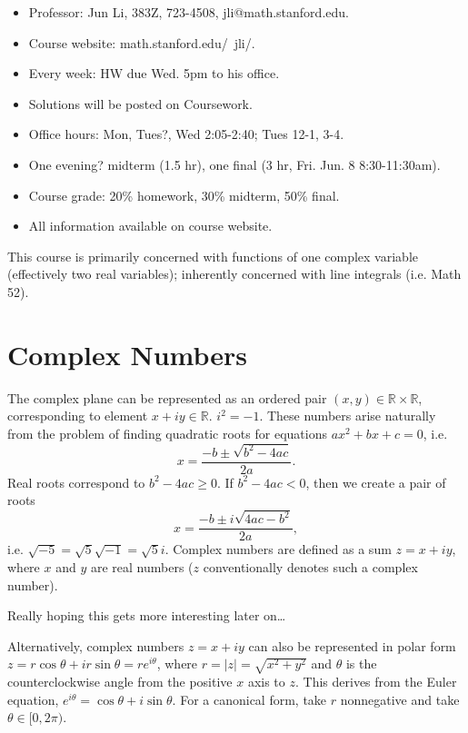 \documentclass{artikel3}
\date{\formatdate{2012}{04}{02}}
\newcommand{\abs}[1]{\left|#1\right|}
\newcommand{\reals}{\mathbb{R}}
\newcommand{\complex}{\mathbb{R}}
\begin{document}
\newcommand{\eqcite}[1]{\text{[#1]}}
\newcommand{\eqnref}[1]{Stmt. \ref{#1}}
\newcommand{\expval}[1]{\left\langle #1\right\rangle}
\newcommand{\closure}[1]{\overline{#1}}
\begin{itemize}
	\item
		Professor: Jun Li, 383Z, 723-4508, jli@math.stanford.edu.
	\item
		Course website: math.stanford.edu/~jli/.
	\item
		Every week: HW due Wed. 5pm to his office.
	\item
		Solutions will be posted on Coursework.
	\item
		Office hours: Mon, Tues?, Wed 2:05-2:40; Tues 12-1, 3-4.
	\item
		One evening? midterm (1.5 hr), one final (3 hr, Fri. Jun. 8 8:30-11:30am).
	\item
		Course grade: 20\% homework, 30\% midterm, 50\% final.
	\item
		All information available on course website.
\end{itemize}

This course is primarily concerned with functions of one complex variable (effectively two real variables);
inherently concerned with line integrals (i.e. Math 52).

\section{Complex Numbers}
The complex plane can be represented as an ordered pair $(x,y)\in \reals\times\reals$, corresponding
to element $x+iy\in\complex$.  $i^2=-1$.  These numbers arise naturally from
the problem of finding quadratic roots for equations $ax^2+bx+c=0$, i.e. \[
	x = \frac{-b\pm\sqrt{b^2-4ac}}{2a}.
\] Real roots correspond to $b^2-4ac\geq 0$.  If $b^2-4ac<0$, then we create a pair
of roots \[
	x = \frac{-b\pm i\sqrt{4ac-b^2}}{2a},
\] i.e. $\sqrt{-5}=\sqrt{5}\sqrt{-1}=\sqrt{5}i$.
Complex numbers are defined as a sum $z=x+iy$, where $x$ and $y$ are real numbers
($z$ conventionally denotes such a complex number).

Really hoping this gets more interesting later on\ldots

Alternatively, complex numbers $z=x+iy$ can also be represented in polar
form $z=r\cos\theta+ir\sin\theta=re^{i\theta}$, where $r=\abs{z}=\sqrt{x^2+y^2}$
and $\theta$ is the counterclockwise angle from the positive $x$ axis to $z$.
This derives from the Euler equation, $e^{i\theta}=\cos\theta+i\sin\theta$.
For a canonical form, take $r$ nonnegative and take $\theta\in [0,2\pi)$.
\end{document}
